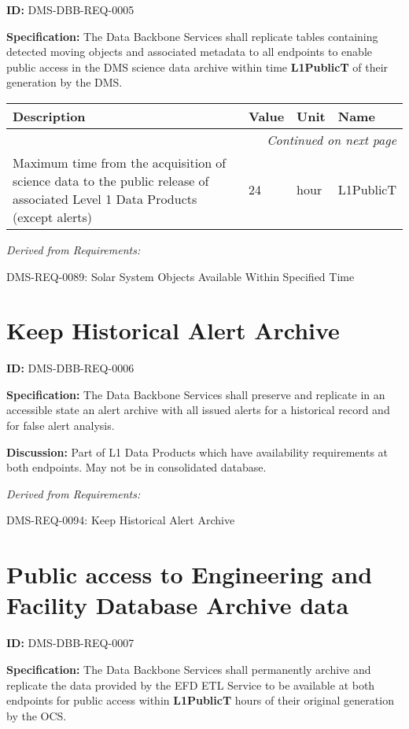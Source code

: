 \documentclass[SE,toc,lsstdraft]{lsstdoc}
\makeatletter
\newcommand{\paramname}[1]{\hspace{0pt}#1}
\newcommand{\unitname}[1]{\hspace{0pt}#1}
\newenvironment{parameters}[0]{%
\setlength\LTleft{0pt}
\setlength\LTright{\fill}
\begin{small}
\begin{longtable}[]{|p{0.49\textwidth}|l|p{0.6in}|p{1.70in}@{}|}

\hline \textbf{Description} & \textbf{Value} & \textbf{Unit} & \textbf{Name} \\ \hline
\endhead

\hline \multicolumn{4}{r}{\emph{Continued on next page}} \\
\endfoot

\hline\hline
\endlastfoot
}{%
\hline
\end{longtable}
\end{small}
}
\makeatother
\begin{document}
\label{DMS-DBB-REQ-0005}
\textbf{ID:} DMS-DBB-REQ-0005

\textbf{Specification:}
The Data Backbone Services shall replicate tables containing detected moving objects and associated metadata to all endpoints to enable public access in the DMS science data archive within time \textbf{L1PublicT} of their generation by the DMS.

\begin{parameters}
Maximum time from the acquisition of science data to the public release of associated Level 1 Data Products (except alerts)
&
24
&
\unitname{%
hour
}
&
\paramname{%
L1PublicT
} \\\hline
\end{parameters}

\emph{Derived from Requirements:}

DMS-REQ-0089:
Solar System Objects Available Within Specified Time \newline

\section{Keep Historical Alert Archive}

\label{DMS-DBB-REQ-0006}
\textbf{ID:} DMS-DBB-REQ-0006

\textbf{Specification:}
The Data Backbone Services shall preserve and replicate in an accessible state an alert archive with all issued alerts for a historical record and for false alert analysis.

\textbf{Discussion:}
Part of L1 Data Products which have availability requirements at both endpoints.  May not be in consolidated database.

\emph{Derived from Requirements:}

DMS-REQ-0094:
Keep Historical Alert Archive \newline

\section{Public access to Engineering and Facility Database Archive data}

\label{DMS-DBB-REQ-0007}
\textbf{ID:} DMS-DBB-REQ-0007

\textbf{Specification:}
The Data Backbone Services shall permanently archive and replicate the data provided by the EFD ETL Service to be available at both endpoints for public access within \textbf{L1PublicT} hours of their original generation by the OCS.
\end{document}
